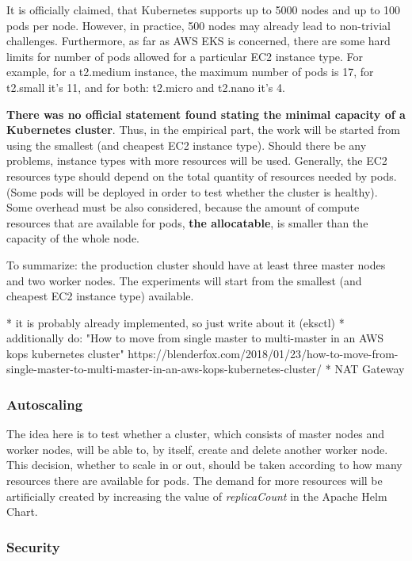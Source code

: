 It is officially claimed, that Kubernetes supports up to 5000 nodes and up to 100 pods per node\cite{kubernetes-node-size}\cite{kubernetes-large}. However, in practice, 500 nodes may already lead to non-trivial challenges. Furthermore, as far as AWS EKS is concerned, there are some hard limits for number of pods allowed for a particular EC2 instance type. For example, for a t2.medium instance, the maximum number of pods is 17, for t2.small it's 11, and for both: t2.micro and t2.nano it's 4\cite{kubernetes-node-size}\cite{eks-hard-limits}.

\textbf{There was no official statement found stating the minimal capacity of a Kubernetes cluster}. Thus, in the empirical part, the work will be started from using the smallest (and cheapest EC2 instance type). Should there be any problems, instance types with more resources will be used. Generally, the EC2 resources type should depend on the total quantity of resources needed by pods. (Some pods will be deployed in order to test whether the cluster is healthy). Some overhead must be also considered, because the amount of compute resources that are available for pods, \textbf{the allocatable}, is smaller than the capacity of the whole node\cite{k8s-alloc}.

To summarize: the production cluster should have at least three master nodes and two worker nodes. The experiments will start from the smallest (and cheapest EC2 instance type) available.

* it is probably already implemented, so just write about it (eksctl)
* additionally do: "How to move from single master to multi-master in an AWS kops kubernetes cluster" https://blenderfox.com/2018/01/23/how-to-move-from-single-master-to-multi-master-in-an-aws-kops-kubernetes-cluster/
* NAT Gateway

\subsubsection{Autoscaling}

The idea here is to test whether a cluster, which consists of master nodes and worker nodes, will be able to, by itself, create and delete another worker node. This decision, whether to scale in or out, should be taken according to how many resources there are available for pods. The demand for more resources will be artificially created by increasing the value of \textit{replicaCount} in the Apache Helm Chart\cite{helm-apache}.


\subsubsection{Security}

